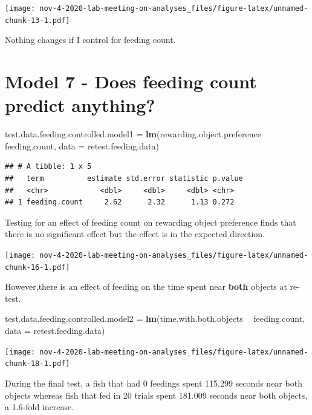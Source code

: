 \documentclass[]{book}
\newenvironment{Shaded}{\begin{snugshade}}{\end{snugshade}}
\newcommand{\KeywordTok}[1]{\textcolor[rgb]{0.13,0.29,0.53}{\textbf{#1}}}
\newcommand{\DataTypeTok}[1]{\textcolor[rgb]{0.13,0.29,0.53}{#1}}
\newcommand{\StringTok}[1]{\textcolor[rgb]{0.31,0.60,0.02}{#1}}
\newcommand{\OperatorTok}[1]{\textcolor[rgb]{0.81,0.36,0.00}{\textbf{#1}}}
\newcommand{\NormalTok}[1]{#1}
\begin{document}
\texttt{[image: nov-4-2020-lab-meeting-on-analyses\_files/figure-latex/unnamed-chunk-13-1.pdf]}

Nothing changes if I control for feeding count.

\chapter{Model 7 - Does feeding count predict
anything?}\label{model-7---does-feeding-count-predict-anything}

\begin{Shaded}
\begin{Highlighting}[]
\NormalTok{test.data.feeding.controlled.model1 =}\StringTok{ }
\StringTok{  }\KeywordTok{lm}\NormalTok{(rewarding.object.preference }\OperatorTok{~}\StringTok{ }\NormalTok{feeding.count,}
     \DataTypeTok{data =}\NormalTok{ retest.feeding.data)}
\end{Highlighting}
\end{Shaded}

\begin{verbatim}
## # A tibble: 1 x 5
##   term          estimate std.error statistic p.value
##   <chr>            <dbl>     <dbl>     <dbl> <chr>  
## 1 feeding.count     2.62      2.32      1.13 0.272
\end{verbatim}

Testing for an effect of feeding count on rewarding object preference
finds that there is no significant effect but the effect is in the
expected direction.

\texttt{[image: nov-4-2020-lab-meeting-on-analyses\_files/figure-latex/unnamed-chunk-16-1.pdf]}

However,there is an effect of feeding on the time spent near
\textbf{both} objects at re-test.

\begin{Shaded}
\begin{Highlighting}[]
\NormalTok{test.data.feeding.controlled.model2 =}\StringTok{ }
\StringTok{  }\KeywordTok{lm}\NormalTok{(time.with.both.objects }\OperatorTok{~}\StringTok{ }\NormalTok{feeding.count,}
     \DataTypeTok{data =}\NormalTok{ retest.feeding.data)}
\end{Highlighting}
\end{Shaded}

\texttt{[image: nov-4-2020-lab-meeting-on-analyses\_files/figure-latex/unnamed-chunk-18-1.pdf]}

During the final test, a fish that had 0 feedings spent 115.299 seconds
near both objects whereas fish that fed in 20 trials spent 181.009
seconds near both objects, a 1.6-fold increase.
\end{document}
